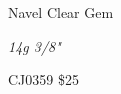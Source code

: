 \documentclass[8pt]{article}
\date{\today}
\title{}
\begin{document}
\begin{center}{\large{Navel Clear Gem}}

\end{center}
\begin{center}{\Large\textit{14g 3/8"}}

\end{center}
\begin{center}{\large{CJ0359\hspace{25mm}  \$25}}

\end{center}
\end{document}
